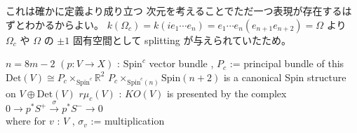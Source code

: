 \begin{Proof}
\itemprof
  これは確かに定義より成り立つ
\itemprof
  次元を考えることでただ一つ表現が存在するはずとわかるからよい。
\itemprof
  \(k(\Omega_c) = k(i e_1 \cdots e_n) = e_1 \cdots e_n (e_{n+1} e_{n+2}) = \Omega\) より
\itemprof
  \(\Omega_c\) や \(\Omega\) の \(\pm 1\) 固有空間として splitting が与えられていたため。
\end{Proof}

\begin{Theorem}
\itemwhen
  \(n = 8 m - 2\)
\itemprop
  \For \((p : V \to X)\) : \(\text{Spin}^c\) vector bundle , \(P_c\) := principal bundle of this\\
  \Then \(\text{Det}(V) \cong P_c \times_{\text{Spin}^c} \mathbb{R}^2\)
\itemprop
  \Then \(P_c \times_{\text{Spin}^c(n)} \text{Spin}(n+2)\) is a canonical Spin structure on \(V \oplus \text{Det}(V) \)
\itemprop
  \Then \(r \mu_c(V)\) : \(KO(V)\) is presented by the complex \(0 \to p^* {S^+} \overset{\sigma}{\to} p^*{S^-} \to 0\) \\ where for \(v\) : \(V\) , \(\sigma_v\) := multiplication
\end{Theorem}